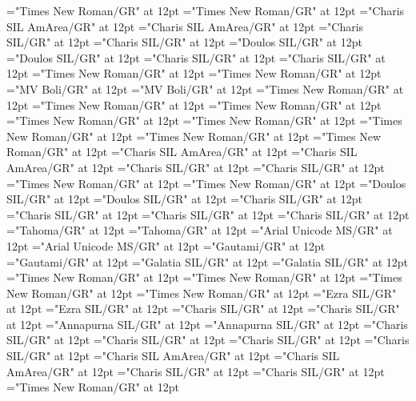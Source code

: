 \documentclass[a4paper]{article}
\begin{document}
\pagestyle{plain}
\sloppy
\setlength{\parfillskip}{0pt plus 1fil}
\font\divarIQ="Times New Roman/GR" at 12pt
\font\spanarIQ="Times New Roman/GR" at 12pt
\font\divblz="Charis SIL AmArea/GR" at 12pt
\font\spanblz="Charis SIL AmArea/GR" at 12pt
\font\divbn="Charis SIL/GR" at 12pt
\font\spanbn="Charis SIL/GR" at 12pt
\font\divbzhfonipa="Doulos SIL/GR" at 12pt
\font\spanbzhfonipa="Doulos SIL/GR" at 12pt
\font\divbzh="Charis SIL/GR" at 12pt
\font\spanbzh="Charis SIL/GR" at 12pt
\font\divde="Times New Roman/GR" at 12pt
\font\spande="Times New Roman/GR" at 12pt
\font\divdv="MV Boli/GR" at 12pt
\font\spandv="MV Boli/GR" at 12pt
\font\divenfonipa="Times New Roman/GR" at 12pt
\font\spanenfonipa="Times New Roman/GR" at 12pt
\font\divenGB="Times New Roman/GR" at 12pt
\font\spanenGB="Times New Roman/GR" at 12pt
\font\divenPH="Times New Roman/GR" at 12pt
\font\spanenPH="Times New Roman/GR" at 12pt
\font\diven="Times New Roman/GR" at 12pt
\font\spanen="Times New Roman/GR" at 12pt
\font\divesaab="Charis SIL AmArea/GR" at 12pt
\font\spanesaab="Charis SIL AmArea/GR" at 12pt
\font\dives="Charis SIL/GR" at 12pt
\font\spanes="Charis SIL/GR" at 12pt
\font\divfa="Times New Roman/GR" at 12pt
\font\spanfa="Times New Roman/GR" at 12pt
\font\divfrfonipa="Doulos SIL/GR" at 12pt
\font\spanfrfonipa="Doulos SIL/GR" at 12pt
\font\divfrZxxxxaudio="Charis SIL/GR" at 12pt
\font\spanfrZxxxxaudio="Charis SIL/GR" at 12pt
\font\divfr="Charis SIL/GR" at 12pt
\font\spanfr="Charis SIL/GR" at 12pt
\font\divggofonipaxemic="Tahoma/GR" at 12pt
\font\spanggofonipaxemic="Tahoma/GR" at 12pt
\font\divggoINxaheri="Arial Unicode MS/GR" at 12pt
\font\spanggoINxaheri="Arial Unicode MS/GR" at 12pt
\font\divggoTeluIN="Gautami/GR" at 12pt
\font\spanggoTeluIN="Gautami/GR" at 12pt
\font\divgrc="Galatia SIL/GR" at 12pt
\font\spangrc="Galatia SIL/GR" at 12pt
\font\divhagLatnGHfonipaxemic="Times New Roman/GR" at 12pt
\font\spanhagLatnGHfonipaxemic="Times New Roman/GR" at 12pt
\font\divhag="Times New Roman/GR" at 12pt
\font\spanhag="Times New Roman/GR" at 12pt
\font\divhbo="Ezra SIL/GR" at 12pt
\font\spanhbo="Ezra SIL/GR" at 12pt
\font\divhe="Charis SIL/GR" at 12pt
\font\spanhe="Charis SIL/GR" at 12pt
\font\divhi="Annapurna SIL/GR" at 12pt
\font\spanhi="Annapurna SIL/GR" at 12pt
\font\divhu="Charis SIL/GR" at 12pt
\font\spanhu="Charis SIL/GR" at 12pt
\font\divibafonipa="Charis SIL/GR" at 12pt
\font\spanibafonipa="Charis SIL/GR" at 12pt
\font\diviba="Charis SIL AmArea/GR" at 12pt
\font\spaniba="Charis SIL AmArea/GR" at 12pt
\font\dividZxxxxaudio="Charis SIL/GR" at 12pt
\font\spanidZxxxxaudio="Charis SIL/GR" at 12pt
\font\divid="Times New Roman/GR" at 12pt
\end{document}
